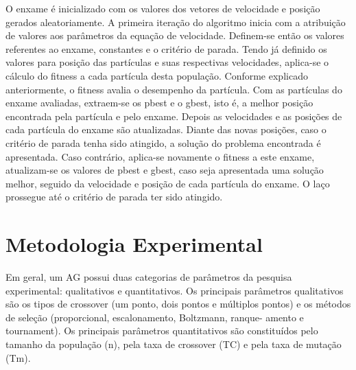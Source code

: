 \documentclass[conference]{IEEEtran}
\begin{document}
	O enxame é inicializado com os valores dos vetores de velocidade e posição gerados aleatoriamente. A primeira iteração do algoritmo inicia com a atribuição de valores aos parâmetros da equação de velocidade. Definem-se então os valores referentes ao enxame, constantes e o critério de parada. Tendo já definido os valores para posição das partículas e suas respectivas velocidades, aplica-se o cálculo do fitness a cada partícula desta população. Conforme explicado anteriormente, o fitness avalia o desempenho da partícula. Com as partículas do enxame avaliadas, extraem-se os pbest e o gbest, isto é, a melhor posição encontrada pela partícula e pelo enxame. Depois as velocidades e as posições de cada partícula do enxame são atualizadas. Diante das novas posições, caso o critério de parada tenha sido atingido, a solução do problema encontrada é apresentada. Caso contrário, aplica-se novamente o fitness a este enxame, atualizam-se os valores de pbest e gbest, caso seja apresentada uma solução melhor, seguido da velocidade e posição de cada partícula do enxame. O laço prossegue até o critério de parada ter sido atingido.
    
    
\section{Metodologia Experimental}
    
    Em geral, um AG possui duas categorias de parâmetros da pesquisa experimental: qualitativos e quantitativos. Os principais parâmetros qualitativos são os tipos de crossover (um ponto, dois pontos e múltiplos pontos) e os métodos de seleção (proporcional, escalonamento, Boltzmann, ranque- amento e tournament). Os principais parâmetros quantitativos são constituídos pelo tamanho da população (n), pela taxa de crossover (TC) e pela taxa de mutação (Tm).
    
\end{document}
